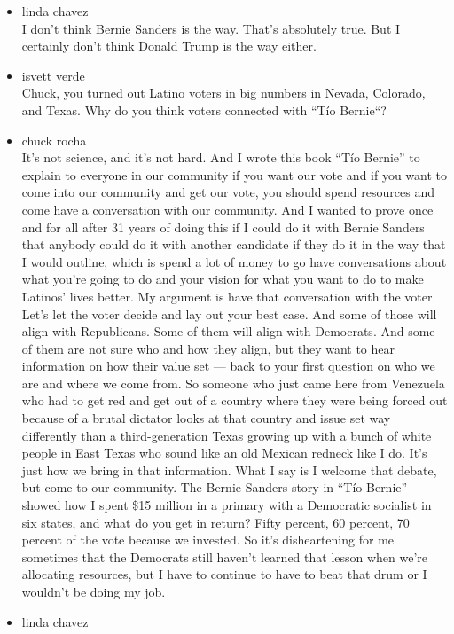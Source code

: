 \begin{itemize}
\item
  linda chavez\\
  I don't think Bernie Sanders is the way. That's absolutely true. But I
  certainly don't think Donald Trump is the way either.
\item
  isvett verde\\
  Chuck, you turned out Latino voters in big numbers in Nevada,
  Colorado, and Texas. Why do you think voters connected with ``Tío
  Bernie``?
\item
  chuck rocha\\
  It's not science, and it's not hard. And I wrote this book ``Tío
  Bernie'' to explain to everyone in our community if you want our vote
  and if you want to come into our community and get our vote, you
  should spend resources and come have a conversation with our
  community. And I wanted to prove once and for all after 31 years of
  doing this if I could do it with Bernie Sanders that anybody could do
  it with another candidate if they do it in the way that I would
  outline, which is spend a lot of money to go have conversations about
  what you're going to do and your vision for what you want to do to
  make Latinos' lives better. My argument is have that conversation with
  the voter. Let's let the voter decide and lay out your best case. And
  some of those will align with Republicans. Some of them will align
  with Democrats. And some of them are not sure who and how they align,
  but they want to hear information on how their value set --- back to
  your first question on who we are and where we come from. So someone
  who just came here from Venezuela who had to get red and get out of a
  country where they were being forced out because of a brutal dictator
  looks at that country and issue set way differently than a
  third-generation Texas growing up with a bunch of white people in East
  Texas who sound like an old Mexican redneck like I do. It's just how
  we bring in that information. What I say is I welcome that debate, but
  come to our community. The Bernie Sanders story in ``Tío Bernie''
  showed how I spent \$15 million in a primary with a Democratic
  socialist in six states, and what do you get in return? Fifty percent,
  60 percent, 70 percent of the vote because we invested. So it's
  disheartening for me sometimes that the Democrats still haven't
  learned that lesson when we're allocating resources, but I have to
  continue to have to beat that drum or I wouldn't be doing my job.
\item
  linda chavez\\

\end{itemize}
